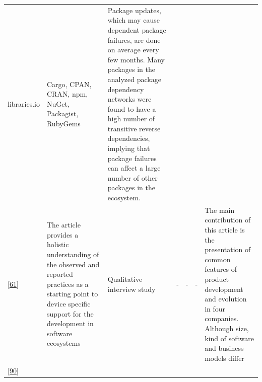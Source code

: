 \documentclass[]{book}
\begin{document}
\begin{longtable}[]{@{}lllllll@{}}
\begin{minipage}[t]{0.10\columnwidth}
libraries.io\strut
\end{minipage} & \begin{minipage}[t]{0.12\columnwidth}\raggedright\strut
Cargo, CPAN, CRAN, npm, NuGet, Packagist, RubyGems\strut
\end{minipage} & \begin{minipage}[t]{0.10\columnwidth}\raggedright\strut
Package updates, which may cause dependent package failures, are done on
average every few months. Many packages in the analyzed package
dependency networks were found to have a high number of transitive
reverse dependencies, implying that package failures can affect a large
number of other packages in the ecosystem.\strut
\end{minipage}\tabularnewline
\begin{minipage}[t]{0.09\columnwidth}\raggedright\strut
{[}\protect\hyperlink{ref-Dittrich2014}{61}{]}\strut
\end{minipage} & \begin{minipage}[t]{0.16\columnwidth}\raggedright\strut
The article provides a holistic understanding of the observed and
reported practices as a starting point to device specific support for
the development in software ecosystems\strut
\end{minipage} & \begin{minipage}[t]{0.17\columnwidth}\raggedright\strut
Qualitative interview study\strut
\end{minipage} & \begin{minipage}[t]{0.07\columnwidth}\raggedright\strut
-\strut
\end{minipage} & \begin{minipage}[t]{0.10\columnwidth}\raggedright\strut
-\strut
\end{minipage} & \begin{minipage}[t]{0.12\columnwidth}\raggedright\strut
-\strut
\end{minipage} & \begin{minipage}[t]{0.10\columnwidth}\raggedright\strut
The main contribution of this article is the presentation of common
features of product development and evolution in four companies.
Although size, kind of software and business models differ\strut
\end{minipage}\tabularnewline
\begin{minipage}[t]{0.09\columnwidth}\raggedright\strut
{[}\protect\hyperlink{ref-Izquierdo2018}{90}{]}\strut
\end{minipage} & \begin{minipage}[t]{0.16\columnwidth}\raggedright\strut

\end{minipage}
\end{longtable}
\end{document}
